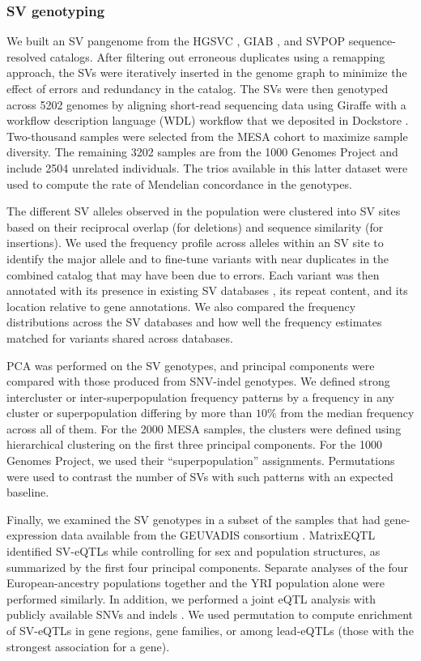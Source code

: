 \documentclass[11pt]{ucscthesis}
\begin{document}
\subsubsection{SV genotyping}
We built an SV pangenome from the HGSVC \cite{chaisson_sv_2019}, GIAB \cite{zook_robust_2020}, and SVPOP \cite{audano_hgsvc} sequence-resolved catalogs.
After filtering out erroneous duplicates using a remapping approach, the SVs were iteratively inserted in the genome graph to minimize the effect of errors and redundancy in the catalog.
The SVs were then genotyped across 5202 genomes by aligning short-read sequencing data using Giraffe with a workflow description language (WDL) workflow that we deposited in Dockstore \cite{vgsv_dockstore}.
Two-thousand samples were selected from the MESA cohort to maximize sample diversity.
The remaining 3202 samples are from the 1000 Genomes Project and include 2504 unrelated individuals. The trios available in this latter dataset were used to compute the rate of Mendelian concordance in the genotypes.

The different SV alleles observed in the population were clustered into SV sites based on their reciprocal overlap (for deletions) and sequence similarity (for insertions).
We used the frequency profile across alleles within an SV site to identify the major allele and to fine-tune variants with near duplicates in the combined catalog that may have been due to errors.
Each variant was then annotated with its presence in existing SV databases \cite{audano_hgsvc,1000gp_sv_2015,gnomadsv_2020}, its repeat content, and its location relative to gene annotations.
We also compared the frequency distributions across the SV databases and how well the frequency estimates matched for variants shared across databases.

PCA was performed on the SV genotypes, and principal components were compared with those produced from SNV-indel genotypes.
We defined strong intercluster or inter-superpopulation frequency patterns by a frequency in any cluster or superpopulation differing by more than $10\%$ from the median frequency across all of them.
For the 2000 MESA samples, the clusters were defined using hierarchical clustering on the first three principal components.
For the 1000 Genomes Project, we used their “superpopulation” assignments.
Permutations were used to contrast the number of SVs with such patterns with an expected baseline.

Finally, we examined the SV genotypes in a subset of the samples that had gene-expression data available from the GEUVADIS consortium \cite{geuvadis_2013}.
MatrixEQTL \cite{matrix_eqtl_2012} identified SV-eQTLs while controlling for sex and population structures, as summarized by the first four principal components.
Separate analyses of the four European-ancestry populations together and the YRI population alone were performed similarly.
In addition, we performed a joint eQTL analysis with publicly available SNVs and indels \cite{1000gp_nygc_2021}.
We used permutation to compute enrichment of SV-eQTLs in gene regions, gene families, or among lead-eQTLs (those with the strongest association for a gene).
\end{document}
